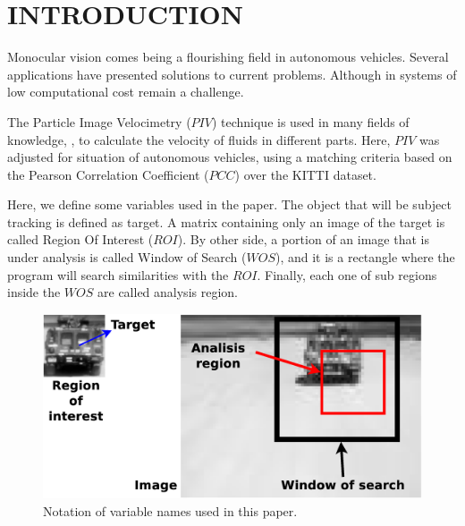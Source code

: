 \section{INTRODUCTION}

Monocular vision comes being a flourishing field in autonomous vehicles. 
Several applications have presented solutions to current problems. 
Although in systems  of low computational cost remain a challenge. 


The Particle Image Velocimetry ($PIV$)\cite{Bastiaans} technique is used in many fields of 
knowledge, \cite{Story, Xu}, to calculate the velocity of fluids in different parts. 
Here, $PIV$ was adjusted for situation of autonomous vehicles, using a matching criteria based on 
the Pearson Correlation Coefficient ($PCC$)\cite{Miranda Neto} over the KITTI dataset\cite{Geiger}.

Here, we define some variables used in the paper. The object that will be subject tracking is defined as target.
A matrix containing only an image of the target is called Region Of Interest ($ROI$).
By other side, a portion of an image that is under analysis is called Window of Search ($WOS$), 
and it is a rectangle where the program will search similarities with the $ROI$.
Finally, each one of sub regions inside the $WOS$ are called analysis region.

\begin{figure}[bhp]
\centering
\includegraphics[width=0.7\columnwidth]{images/Diagrama2.eps}
\caption{Notation of variable names used in this paper.}
\label{fig:systemnotation}
\end{figure}

